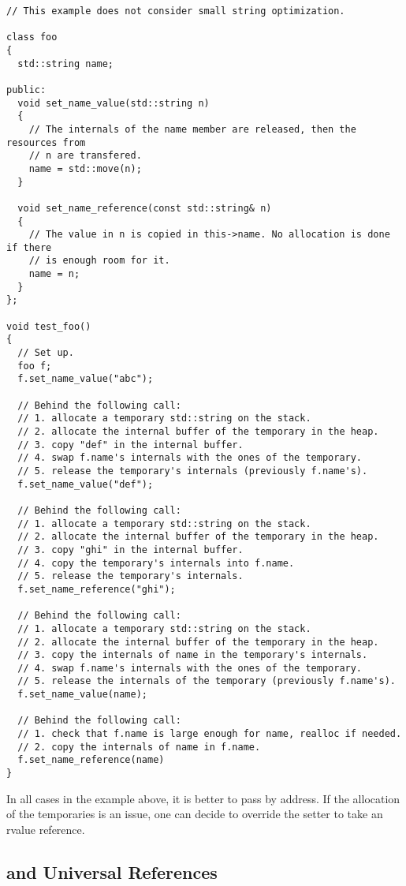 \begin{lstlisting}
// This example does not consider small string optimization.

class foo
{
  std::string name;

public:
  void set_name_value(std::string n)
  {
    // The internals of the name member are released, then the resources from
    // n are transfered.
    name = std::move(n);
  }

  void set_name_reference(const std::string& n)
  {
    // The value in n is copied in this->name. No allocation is done if there
    // is enough room for it.
    name = n;
  }
};

void test_foo()
{
  // Set up.
  foo f;
  f.set_name_value("abc");

  // Behind the following call:
  // 1. allocate a temporary std::string on the stack.
  // 2. allocate the internal buffer of the temporary in the heap.
  // 3. copy "def" in the internal buffer.
  // 4. swap f.name's internals with the ones of the temporary.
  // 5. release the temporary's internals (previously f.name's).
  f.set_name_value("def");

  // Behind the following call:
  // 1. allocate a temporary std::string on the stack.
  // 2. allocate the internal buffer of the temporary in the heap.
  // 3. copy "ghi" in the internal buffer.
  // 4. copy the temporary's internals into f.name.
  // 5. release the temporary's internals.
  f.set_name_reference("ghi");

  // Behind the following call:
  // 1. allocate a temporary std::string on the stack.
  // 2. allocate the internal buffer of the temporary in the heap.
  // 3. copy the internals of name in the temporary's internals.
  // 4. swap f.name's internals with the ones of the temporary.
  // 5. release the internals of the temporary (previously f.name's).
  f.set_name_value(name);

  // Behind the following call:
  // 1. check that f.name is large enough for name, realloc if needed.
  // 2. copy the internals of name in f.name.
  f.set_name_reference(name)
}
\end{lstlisting}

In all cases in the example above, it is better to pass by address. If
the allocation of the temporaries is an issue, one can decide to
override the setter to take an rvalue reference.

\subsection{ and Universal References}

